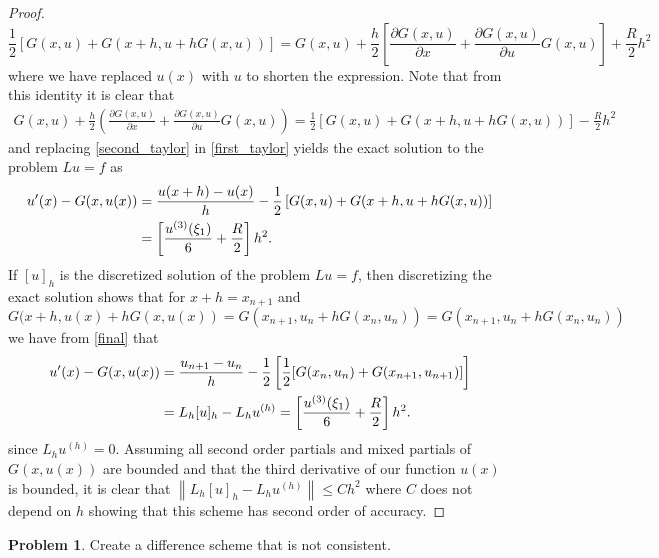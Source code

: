 \documentclass[12pt]{article}
\theoremstyle{definition}
\newtheorem{problem}{Problem}
\newcommand\norm[1]{\left\lVert#1\right\rVert}
\begin{document}
\begin{proof}
  \[
    \frac{1}{2}\left[G(x, u) + G(x + h, u + hG(x, u))\right] = G(x, u) + \frac{h}{2}\left[\frac{\partial G(x, u)}{\partial x} + \frac{\partial G(x, u)}{\partial u}G(x, u)\right] + \frac{R}{2}h^2
  \]
  where we have replaced $u(x)$ with $u$ to shorten the expression. Note that from this identity it is clear that
  \begin{align}\label{second_taylor}
    G(x, u) + \frac{h}{2}\left(\frac{\partial G(x, u)}{\partial x} + \frac{\partial G(x, u)}{\partial u}G(x, u)\right) = \frac{1}{2}\left[G(x, u) + G(x + h, u + hG(x, u))\right] - \frac{R}{2}h^2
  \end{align}
  and replacing \eqref{second_taylor} in \eqref{first_taylor} yields the exact solution to the problem $Lu = f$ as
  \begin{align}\label{final}
    u^{\prime}(x) - G(x, u(x)) &= \frac{u(x+h) - u(x)}{h} - \frac{1}{2}\left[G(x, u) + G(x + h, u + hG(x, u))\right] \\
    &= \left[\frac{u^{(3)}(\xi_1)}{6} +  \frac{R}{2}\right]h^2.\notag
  \end{align}
  If $[u]_h$ is the discretized solution of the problem $Lu =f$, then discretizing
  the exact solution shows that for $x + h = x_{n+1}$ and $G(x+h,u(x)+ h G(x, u(x)) = G(x_{n+1}, u_n + hG(x_n, u_n)) =G(x_{n+1}, u_n + h G(x_n, u_n))$
  we have from \eqref{final} that
  \begin{align*}
    u^{\prime}(x) - G(x, u(x)) &= \frac{u_{n+1} - u_n}{h} - \frac{1}{2}\left[\frac{1}{2}[G(x_n, u_n) + G(x_{n+1}, u_{n+1})]\right] \\
    &= L_h[u]_h - L_h u^{(h)} =  \left[\frac{u^{(3)}(\xi_1)}{6} +  \frac{R}{2}\right]h^2.\notag
  \end{align*}
  since $L_h u^{(h)} = 0$. Assuming all second order partials and mixed partials of $G(x, u(x))$ are bounded and that the third derivative of our function $u(x)$ is bounded,
  it is clear that $\norm{L_h[u]_h - L_hu^{(h)}} \leq C h^2$ where $C$ does not depend on $h$
  showing that this scheme has second order of accuracy.
\end{proof}


\begin{problem}
  Create a difference scheme that is not consistent.
\end{problem}
\end{document}
